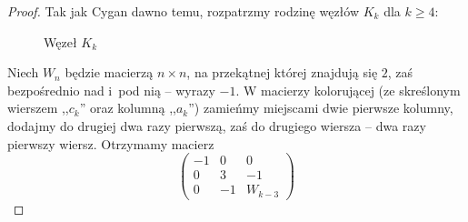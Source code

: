 \begin{proof}
    Tak jak Cygan dawno temu, rozpatrzmy rodzinę węzłów $K_k$ dla $k \ge 4$:
%

\begin{figure}[H]
    \centering

    \caption[caption-cygan]{Węzeł $K_k$}
\end{figure}

    Niech $W_n$ będzie macierzą $n \times n$, na przekątnej której znajdują się $2$, zaś bezpośrednio nad i~pod nią -- wyrazy $-1$.
    W macierzy kolorującej (ze skreślonym wierszem ,,$c_k$'' oraz kolumną ,,$a_k$'') zamieńmy miejscami dwie pierwsze kolumny, dodajmy do drugiej dwa razy pierwszą, zaś do drugiego wiersza -- dwa razy pierwszy wiersz.
    Otrzymamy macierz
    \begin{equation}
        \begin{pmatrix}
            -1 & 0 & 0 \\
            0 & 3 & -1 \\
            0 & -1 & W_{k-3}
        \end{pmatrix}
    \end{equation}


\end{proof}
